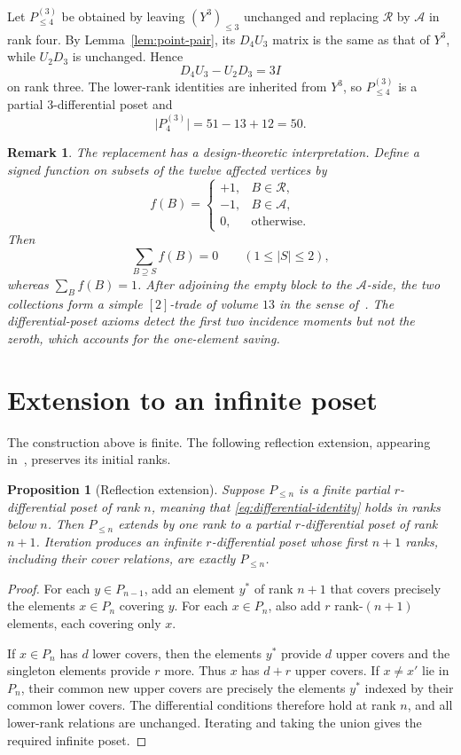 \documentclass[10pt,a4paper]{amsart}
\newtheorem{proposition}[theorem]{Proposition}
\newtheorem{remark}[theorem]{Remark}
\newcommand{\card}[1]{\lvert #1\rvert}
\newcommand{\Rcal}{\mathcal{R}}
\newcommand{\Acal}{\mathcal{A}}
\begin{document}
Let $P^{(3)}_{\leq4}$ be obtained by leaving $(Y^3)_{\leq3}$ unchanged and replacing $\Rcal$ by $\Acal$ in rank four. By Lemma~\ref{lem:point-pair}, its $D_4U_3$ matrix is the same as that of $Y^3$, while $U_2D_3$ is unchanged. Hence
\[
  D_4U_3-U_2D_3=3I
\]
on rank three. The lower-rank identities are inherited from $Y^3$, so $P^{(3)}_{\leq4}$ is a partial $3$-differential poset and
\[
  \card{P^{(3)}_4}=51-13+12=50.
\]

\begin{remark}\label{rem:trade}
The replacement has a design-theoretic interpretation. Define a signed function on subsets of the twelve affected vertices by
\[
  f(B)=
  \begin{cases}
    +1,&B\in\Rcal,\\
    -1,&B\in\Acal,\\
    0,&\text{otherwise}.
  \end{cases}
\]
Then
\[
  \sum_{B\supseteq S}f(B)=0
  \qquad(1\leq\card{S}\leq2),
\]
whereas $\sum_Bf(B)=1$. After adjoining the empty block to the $\Acal$-side, the two collections form a simple $[2]$-trade of volume $13$ in the sense of~\cite{GhorbaniEtAl2020}. The differential-poset axioms detect the first two incidence moments but not the zeroth, which accounts for the one-element saving.
\end{remark}

\section{Extension to an infinite poset}\label{sec:extension}

The construction above is finite. The following reflection extension, appearing in~\cite[Proposition~6.1]{Stanley1988}, preserves its initial ranks.

\begin{proposition}[Reflection extension]\label{prop:reflection-extension}
Suppose $P_{\leq n}$ is a finite partial $r$-differential poset of rank $n$, meaning that \eqref{eq:differential-identity} holds in ranks below $n$. Then $P_{\leq n}$ extends by one rank to a partial $r$-differential poset of rank $n+1$. Iteration produces an infinite $r$-differential poset whose first $n+1$ ranks, including their cover relations, are exactly $P_{\leq n}$.
\end{proposition}

\begin{proof}
For each $y\in P_{n-1}$, add an element $y^*$ of rank $n+1$ that covers precisely the elements $x\in P_n$ covering $y$. For each $x\in P_n$, also add $r$ rank-$(n+1)$ elements, each covering only $x$.

If $x\in P_n$ has $d$ lower covers, then the elements $y^*$ provide $d$ upper covers and the singleton elements provide $r$ more. Thus $x$ has $d+r$ upper covers. If $x\neq x'$ lie in $P_n$, their common new upper covers are precisely the elements $y^*$ indexed by their common lower covers. The differential conditions therefore hold at rank $n$, and all lower-rank relations are unchanged. Iterating and taking the union gives the required infinite poset.
\end{proof}
\end{document}
